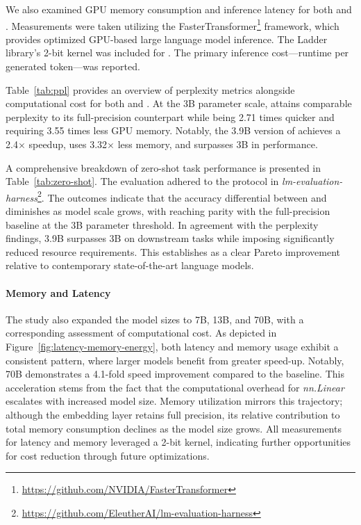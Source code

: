 We also examined GPU memory consumption and inference latency for both  and . Measurements were taken utilizing the FasterTransformer\footnote{\url{https://github.com/NVIDIA/FasterTransformer}} framework, which provides optimized GPU-based large language model inference. The Ladder~\cite{ladder} library’s 2-bit kernel was included for . The primary inference cost—runtime per generated token—was reported.

Table~\ref{tab:ppl} provides an overview of perplexity metrics alongside computational cost for both  and . At the 3B parameter scale,  attains comparable perplexity to its full-precision  counterpart while being 2.71 times quicker and requiring 3.55 times less GPU memory. Notably, the 3.9B version of  achieves a 2.4$\times$ speedup, uses 3.32$\times$ less memory, and surpasses  3B in performance.

A comprehensive breakdown of zero-shot task performance is presented in Table~\ref{tab:zero-shot}. The evaluation adhered to the protocol in \emph{lm-evaluation-harness}\footnote{\url{https://github.com/EleutherAI/lm-evaluation-harness}}. The outcomes indicate that the accuracy differential between  and  diminishes as model scale grows, with  reaching parity with the full-precision baseline at the 3B parameter threshold. In agreement with the perplexity findings,  3.9B surpasses  3B on downstream tasks while imposing significantly reduced resource requirements. This establishes  as a clear Pareto improvement relative to contemporary state-of-the-art language models.

\paragraph{Memory and Latency}

The study also expanded the model sizes to 7B, 13B, and 70B, with a corresponding assessment of computational cost. As depicted in Figure~\ref{fig:latency-memory-energy}, both latency and memory usage exhibit a consistent pattern, where larger models benefit from greater speed-up. Notably,  70B demonstrates a 4.1-fold speed improvement compared to the  baseline. This acceleration stems from the fact that the computational overhead for \emph{nn.Linear} escalates with increased model size. Memory utilization mirrors this trajectory; although the embedding layer retains full precision, its relative contribution to total memory consumption declines as the model size grows. All measurements for latency and memory leveraged a 2-bit kernel, indicating further opportunities for cost reduction through future optimizations.

